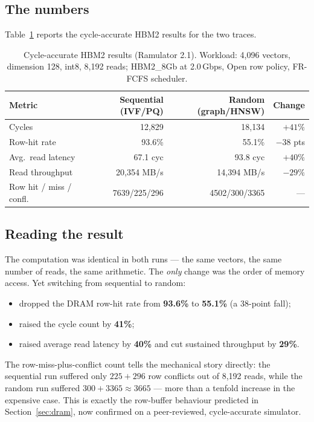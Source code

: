 \documentclass[11pt,a4paper]{article}
\begin{document}
\subsection{The numbers}

Table~\ref{tab:results} reports the cycle-accurate HBM2 results for the two traces.

\begin{table}[h]
\centering
\renewcommand{\arraystretch}{1.25}
\begin{tabular}{lrrr}
\toprule
\textbf{Metric} & \textbf{\color{greenc}Sequential (IVF/PQ)} & \textbf{\color{brick}Random (graph/HNSW)} & \textbf{Change} \\
\midrule
Cycles                 & 12{,}829      & 18{,}134      & $+41\%$ \\
Row-hit rate           & 93.6\%        & 55.1\%        & $-38$ pts \\
Avg.\ read latency     & 67.1 cyc      & 93.8 cyc      & $+40\%$ \\
Read throughput        & 20{,}354 MB/s & 14{,}394 MB/s & $-29\%$ \\
Row hit / miss / confl.& 7639/225/296  & 4502/300/3365 & --- \\
\bottomrule
\end{tabular}
\caption{Cycle-accurate HBM2 results (Ramulator 2.1). Workload: 4{,}096 vectors, dimension 128,
int8, 8{,}192 reads; HBM2\_8Gb at 2.0\,Gbps, Open row policy, FR-FCFS scheduler.}
\label{tab:results}
\end{table}

\subsection{Reading the result}

The computation was identical in both runs --- the same vectors, the same number of reads, the same
arithmetic. The \emph{only} change was the order of memory access. Yet switching from sequential to
random:

\begin{itemize}
\item dropped the DRAM row-hit rate from \textbf{93.6\%} to \textbf{55.1\%} (a 38-point fall);
\item raised the cycle count by \textbf{41\%};
\item raised average read latency by \textbf{40\%} and cut sustained throughput by \textbf{29\%}.
\end{itemize}

The row-miss-plus-conflict count tells the mechanical story directly: the sequential run suffered
only $225+296$ row conflicts out of 8{,}192 reads, while the random run suffered
$300+3365 \approx 3665$ --- more than a tenfold increase in the expensive case. This is exactly the
row-buffer behaviour predicted in Section~\ref{sec:dram}, now confirmed on a peer-reviewed,
cycle-accurate simulator.
\end{document}

